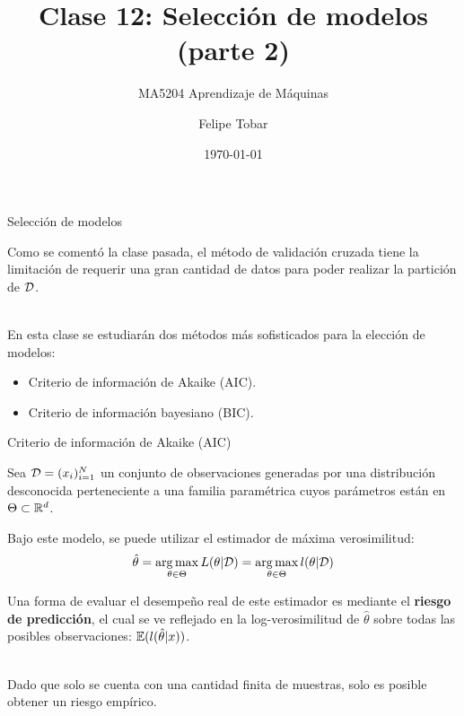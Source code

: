 \documentclass[handout, 9pt]{beamer}
\title{Clase 12: Selección de modelos (parte 2)}
\subtitle{MA5204 Aprendizaje de Máquinas}
\date{\today}
\author{Felipe Tobar}
\institute{Department of Mathematical Engineering \&\\ Center for Mathematical Modelling\\Universidad de Chile}
\begin{document}
\begin{frame}
  \titlepage
\end{frame}

\begin{frame}{Selección de modelos}

Como se comentó la clase pasada, el método de validación cruzada tiene la limitación de requerir una gran cantidad de datos para poder realizar la partición de ${\mathcal D}$.\\~\ \pause

En esta clase se estudiarán dos métodos más sofisticados para la elección de modelos:

\begin{itemize}
	\item Criterio de información de Akaike (AIC).
	\item Criterio de información bayesiano (BIC).
\end{itemize}
	
\end{frame}


\begin{frame}{Criterio de información de Akaike (AIC)}

Sea ${\mathcal D}=(x_i)_{i=1}^N$ un conjunto de observaciones generadas por una distribución desconocida perteneciente a una familia paramétrica cuyos parámetros están en $\Theta\subset\mathbb{R}^d$.\\ \pause

Bajo este modelo, se puede utilizar el estimador de máxima verosimilitud:
\begin{equation*}
	\hat{\theta} = \operatorname*{arg\,max}_{\theta\in\Theta} L(\theta|{\mathcal D}) =  \operatorname*{arg\,max}_{\theta\in\Theta} l(\theta|{\mathcal D})
\end{equation*}

Una forma de evaluar el desempeño real de este estimador es mediante el \textbf{riesgo de predicción}, el cual se ve reflejado en la log-verosimilitud de $\hat{\theta}$ sobre todas las posibles observaciones: $\operatorname{\mathbb{E}}(l(\hat{\theta}|x))$.\\~\ \pause

Dado que solo se cuenta con una cantidad finita de muestras, solo es posible obtener un riesgo empírico.\\

\end{frame}
\end{document}
